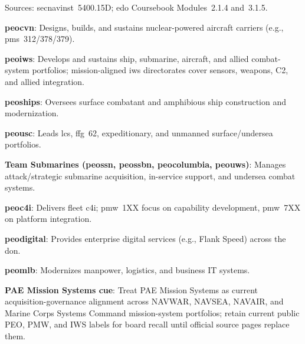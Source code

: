 \documentclass[../main.tex]{subfiles}
\begin{document}
\begin{description}[style=nextline, labelsep=0.5em, font=\bfseries]
  \item[\textbf{Program Executive Offices (Navy portfolios).}]
        Sources: \ac{secnavinst}~5400.15D; \ac{edo} Coursebook Modules~2.1.4 and~3.1.5.
        \begin{description}
          \item \textbf{\ac{peocvn}}: Designs, builds, and sustains nuclear-powered aircraft carriers (e.g., \ac{pms}~312/378/379).
          \item \textbf{\ac{peoiws}}: Develops and sustains ship, submarine, aircraft, and allied combat-system portfolios; mission-aligned \ac{iws} directorates cover sensors, weapons, C2, and allied integration.
          \item \textbf{\ac{peoships}}: Oversees surface combatant and amphibious ship construction and modernization.
          \item \textbf{\ac{peousc}}: Leads \ac{lcs}, \ac{ffg}~62, expeditionary, and unmanned surface/undersea portfolios.
          \item \textbf{Team Submarines (\ac{peossn}, \ac{peossbn}, \ac{peocolumbia}, \ac{peouws})}: Manages attack/strategic submarine acquisition, in-service support, and undersea combat systems.
          \item \textbf{\ac{peoc4i}}: Delivers fleet \ac{c4i}; \ac{pmw}~1XX focus on capability development, \ac{pmw}~7XX on platform integration.
          \item \textbf{\ac{peodigital}}: Provides enterprise digital services (e.g., Flank Speed) across the \ac{don}.
          \item \textbf{\ac{peomlb}}: Modernizes manpower, logistics, and business IT systems.
          \item \textbf{PAE Mission Systems cue}: Treat PAE Mission Systems as current acquisition-governance alignment across NAVWAR, NAVSEA, NAVAIR, and Marine Corps Systems Command mission-system portfolios; retain current public PEO, PMW, and IWS labels for board recall until official source pages replace them.
        \end{description}


\end{description}
\end{document}
